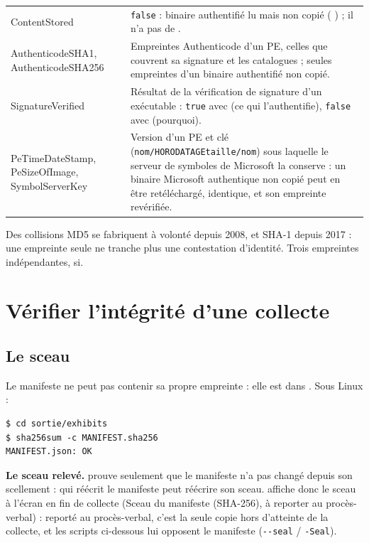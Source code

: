 \documentclass[11pt,a4paper,oneside]{report}
\begin{document}
\begin{longtable}{@{}>{\ttfamily}L{4.2cm}L{10.2cm}@{}}
ContentStored & \texttt{false} : binaire authentifié lu mais non copié
  ( ) ; il n'a pas de . \\
AuthenticodeSHA1, AuthenticodeSHA256 & Empreintes Authenticode d'un PE, celles
  que couvrent sa signature et les catalogues ; seules empreintes d'un binaire
  authentifié non copié. \\
SignatureVerified & Résultat de la vérification de signature d'un exécutable :
  \texttt{true} avec  (ce qui l'authentifie), \texttt{false}
  avec  (pourquoi). \\
PeTimeDateStamp, PeSizeOfImage, SymbolServerKey & Version d'un PE et clé
  (\texttt{nom/HORODATAGEtaille/nom}) sous laquelle le serveur de symboles de
  Microsoft la conserve : un binaire Microsoft authentique non copié peut en
  être retéléchargé, identique, et son empreinte revérifiée. \\
\bottomrule
\end{longtable}

\begin{note}
Des collisions MD5 se fabriquent à volonté depuis 2008, et SHA-1 depuis 2017 : une
empreinte seule ne tranche plus une contestation d'identité. Trois empreintes
indépendantes, si.
\end{note}

\section{Vérifier l'intégrité d'une collecte}\label{sec:verif}

\subsection{Le sceau}

Le manifeste ne peut pas contenir sa propre empreinte : elle est dans
. Sous Linux :

\begin{lstlisting}
$ cd sortie/exhibits
$ sha256sum -c MANIFEST.sha256
MANIFEST.json: OK
\end{lstlisting}

\textbf{Le sceau relevé.}  prouve seulement que le
manifeste n'a pas changé depuis son scellement : qui réécrit le manifeste peut
réécrire son sceau. \wac{} affiche donc le sceau à l'écran en fin de collecte
(\og Sceau du manifeste (SHA-256), à reporter au procès-verbal\fg{}) : reporté
au procès-verbal, c'est la seule copie hors d'atteinte de la collecte, et les
scripts ci-dessous lui opposent le manifeste (\texttt{-{}-seal} /
\texttt{-Seal}).
\end{document}

